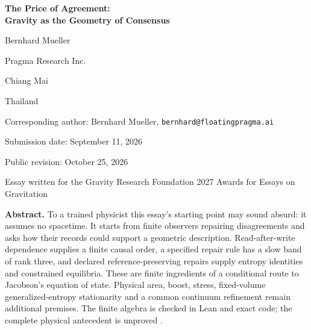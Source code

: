 \documentclass[12pt]{article}
\begin{document}
\hypersetup{pageanchor=false}

\thispagestyle{empty}
\begin{center}
\vspace*{2.5cm}
{\LARGE\bfseries The Price of Agreement:\\[0.4em] Gravity as the Geometry of Consensus\par}
\vspace{2cm}
{\large Bernhard Mueller\par}
\vspace{0.6em}
Pragma Research Inc.\par
\vspace{0.4em}
{\small Chiang Mai\par Thailand\par}
\vspace{0.6em}
Corresponding author: Bernhard Mueller, \texttt{bernhard@floatingpragma.ai}\par
\vspace{2cm}
Submission date: September 11, 2026\par
Public revision: October 25, 2026\par
\vspace{1.5cm}
{\small Essay written for the Gravity Research Foundation 2027 Awards for Essays on Gravitation\par}
\end{center}
\vfill
\begin{singlespace}
\noindent\textbf{Abstract.}
To a trained physicist this essay's starting point may sound absurd: it assumes no spacetime. It starts from finite observers repairing disagreements and asks how their records could support a geometric description. Read-after-write dependence supplies a finite causal order, a specified repair rule has a slow band of rank three, and declared reference-preserving repairs supply entropy identities and constrained equilibria. These are finite ingredients of a conditional route to Jacobson's equation of state. Physical area, boost, stress, fixed-volume generalized-entropy stationarity and a common continuum refinement remain additional premises. The finite algebra is checked in Lean and exact code; the complete physical antecedent is unproved \cite{ophflagship,ophrepo}.
\end{singlespace}
\clearpage
\setcounter{page}{1}
\hypersetup{pageanchor=true}
\end{document}
